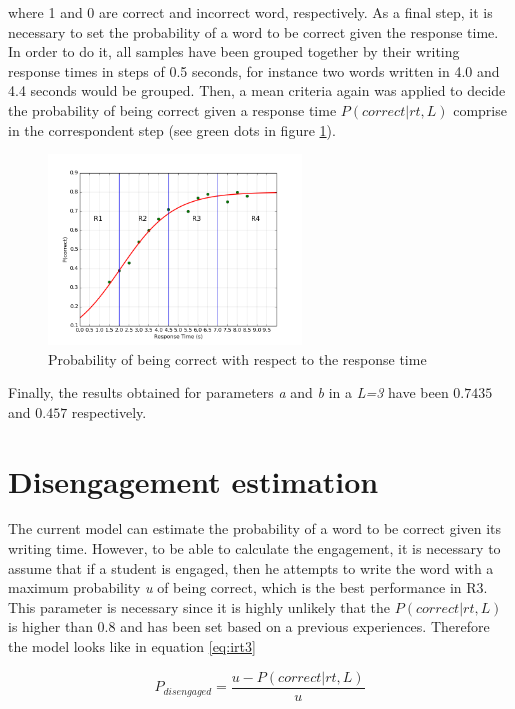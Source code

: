 where 1 and 0 are correct and incorrect word, respectively. As a final step, it is necessary to set the probability of a word to be correct given the response time. In order to do it, all samples have been grouped together by their writing response times in steps of 0.5 seconds, for instance two words written in 4.0 and 4.4 seconds would be grouped. Then, a mean criteria again was applied to decide the probability of being correct given a response time $P(correct|rt,L)$ comprise in the correspondent step (see green dots in figure \ref{fig:IRT}).

\begin{figure}[h!]
        \centering
        \includegraphics[width=0.6\textwidth]{figures/rt.png}
        \caption{Probability of being correct with respect to the response time}
        \label{fig:IRT}
\end{figure}

Finally, the results obtained for parameters \textit{a} and \textit{b} in a \textit{L=3} have been $ 0.7435 $ and $ 0.457 $ respectively.

\section{Disengagement estimation}
The current model can estimate the probability of a word to be correct given its writing time. However, to be able to calculate the engagement, it is necessary to assume that if a student is engaged, then he attempts to write the word with a maximum probability \textit{u} of being correct, which is the best performance in R3. This parameter is necessary since it is highly unlikely that the $ P(correct|rt,L) $ is higher than 0.8 and has been set based on a previous experiences. Therefore the model looks like in equation \ref{eq:irt3}

\begin{equation}\label{eq:irt3}
P_{disengaged} = \frac{u-P(correct|rt,L)}{u}
\end{equation}

